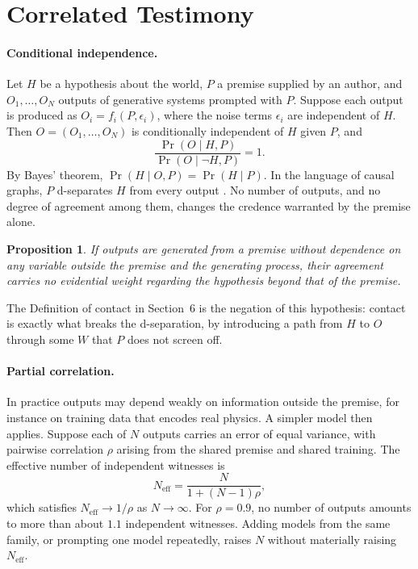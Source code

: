 \documentclass[11pt]{article}
\newtheorem{proposition}{Proposition}
\begin{document}
\section{Correlated Testimony}
\label{app:witness}

\paragraph{Conditional independence.} Let $H$ be a hypothesis about the world, $P$ a premise supplied by an author, and $O_1,\dots,O_N$ outputs of generative systems prompted with $P$. Suppose each output is produced as $O_i = f_i(P, \epsilon_i)$, where the noise terms $\epsilon_i$ are independent of $H$. Then $O = (O_1,\dots,O_N)$ is conditionally independent of $H$ given $P$, and
\begin{equation}
\frac{\Pr(O \mid H, P)}{\Pr(O \mid \neg H, P)} = 1.
\end{equation}
By Bayes' theorem, $\Pr(H \mid O, P) = \Pr(H \mid P)$. In the language of causal graphs, $P$ d-separates $H$ from every output \cite{pearl2009}. No number of outputs, and no degree of agreement among them, changes the credence warranted by the premise alone.

\begin{proposition}
If outputs are generated from a premise without dependence on any variable outside the premise and the generating process, their agreement carries no evidential weight regarding the hypothesis beyond that of the premise.
\end{proposition}

The Definition of contact in Section~6 is the negation of this hypothesis: contact is exactly what breaks the d-separation, by introducing a path from $H$ to $O$ through some $W$ that $P$ does not screen off.

\paragraph{Partial correlation.} In practice outputs may depend weakly on information outside the premise, for instance on training data that encodes real physics. A simpler model then applies. Suppose each of $N$ outputs carries an error of equal variance, with pairwise correlation $\rho$ arising from the shared premise and shared training. The effective number of independent witnesses is \cite{kish1965}
\begin{equation}
N_{\mathrm{eff}} = \frac{N}{1 + (N-1)\rho},
\end{equation}
which satisfies $N_{\mathrm{eff}} \to 1/\rho$ as $N\to\infty$. For $\rho = 0.9$, no number of outputs amounts to more than about $1.1$ independent witnesses. Adding models from the same family, or prompting one model repeatedly, raises $N$ without materially raising $N_{\mathrm{eff}}$.
\end{document}
